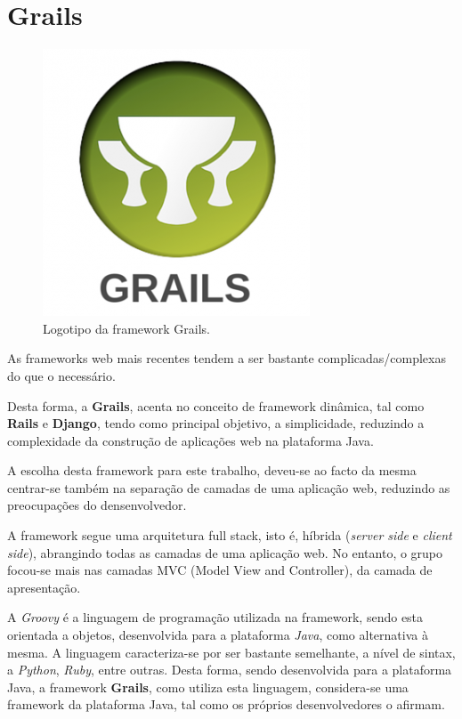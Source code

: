 \section{Grails}
\label{subsec:grails}

\begin{figure}[H]
    \centering
    \includegraphics[scale=0.27]{images/grails.png}
    \caption{Logotipo da framework Grails.}
    \label{fig:grails}
\end{figure}

\hspace{5mm} As frameworks web mais recentes tendem a ser bastante complicadas/complexas do que o necessário. 

\hspace{5mm} Desta forma, a \textbf{Grails}, acenta no conceito de framework dinâmica, tal como \textbf{Rails} e \textbf{Django}, tendo como principal objetivo, a simplicidade, reduzindo a complexidade da construção de aplicações web na plataforma Java.

\hspace{5mm} A escolha desta framework para este trabalho, deveu-se ao facto da mesma centrar-se também na separação de camadas de uma aplicação web, reduzindo as preocupações do densenvolvedor.

\hspace{5mm} A framework segue uma arquitetura full stack, isto é, híbrida (\textit{server side} e \textit{client side}), abrangindo todas as camadas de uma aplicação web. No entanto, o grupo focou-se mais nas camadas MVC (Model View and Controller), da camada de apresentação.

\hspace{5mm} A \textit{Groovy} é a linguagem de programação utilizada na framework, sendo esta orientada a objetos, desenvolvida para a plataforma \textit{Java}, como  alternativa à mesma. A linguagem  caracteriza-se por ser bastante semelhante, a nível de sintax, a \textit{Python}, \textit{Ruby}, entre outras. Desta forma, sendo desenvolvida para a plataforma Java, a framework \textbf{Grails}, como utiliza esta linguagem, considera-se uma framework da plataforma Java, tal como os próprios desenvolvedores o afirmam.

